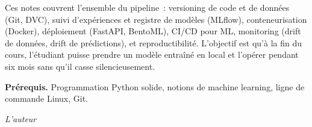 \documentclass[12pt,a4paper,twoside]{book}
\theoremstyle{definition}
\theoremstyle{plain}
\theoremstyle{remark}
\begin{document}
\medskip

Ces notes couvrent l'ensemble du pipeline~: versioning de code et de donn\'ees (Git, DVC), suivi d'exp\'eriences et registre de mod\`eles (MLflow), conteneurisation (Docker), d\'eploiement (FastAPI, BentoML), CI/CD pour ML, monitoring (drift de donn\'ees, drift de pr\'edictions), et reproductibilit\'e. L'objectif est qu'\`a la fin du cours, l'\'etudiant puisse prendre un mod\`ele entra\^in\'e en local et l'op\'erer pendant six mois sans qu'il casse silencieusement.

\medskip

\noindent\textbf{Pr\'erequis.} Programmation Python solide, notions de machine learning, ligne de commande Linux, Git.

\vfill
\hfill\textit{L'auteur}


\mainmatter















\appendix

\end{document}
